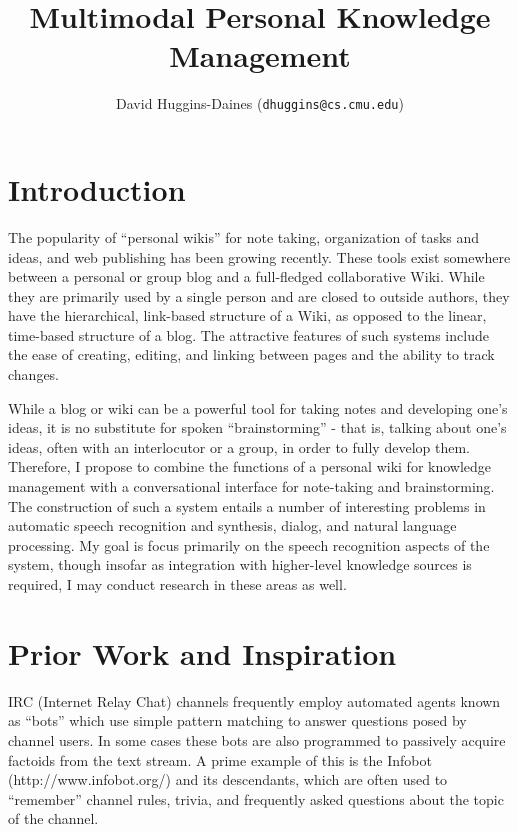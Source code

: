 \documentclass{article}
\author{David Huggins-Daines ({\tt dhuggins@cs.cmu.edu})}
\title{Multimodal Personal Knowledge Management}
\begin{document}
\maketitle

\section{Introduction}
\label{sec:intro}

The popularity of ``personal wikis'' for note taking, organization of
tasks and ideas, and web publishing has been growing recently.  These
tools exist somewhere between a personal or group blog and a
full-fledged collaborative Wiki.  While they are primarily used by a
single person and are closed to outside authors, they have the
hierarchical, link-based structure of a Wiki, as opposed to the
linear, time-based structure of a blog.  The attractive features of
such systems include the ease of creating, editing, and linking between
pages and the ability to track changes.

While a blog or wiki can be a powerful tool for taking notes and
developing one's ideas, it is no substitute for spoken
``brainstorming'' - that is, talking about one's ideas, often with an
interlocutor or a group, in order to fully develop them.  Therefore, I
propose to combine the functions of a personal wiki for knowledge
management with a conversational interface for note-taking and
brainstorming.  The construction of such a system entails a number of
interesting problems in automatic speech recognition and synthesis,
dialog, and natural language processing.  My goal is focus primarily
on the speech recognition aspects of the system, though insofar as
integration with higher-level knowledge sources is required, I may
conduct research in these areas as well.

\section{Prior Work and Inspiration}
\label{sec:prior}

IRC (Internet Relay Chat) channels frequently employ automated agents
known as ``bots'' which use simple pattern matching to answer
questions posed by channel users.  In some cases these bots are also
programmed to passively acquire factoids from the text stream.  A
prime example of this is the Infobot (http://www.infobot.org/) and its
descendants, which are often used to ``remember'' channel rules,
trivia, and frequently asked questions about the topic of the channel.
\end{document}
